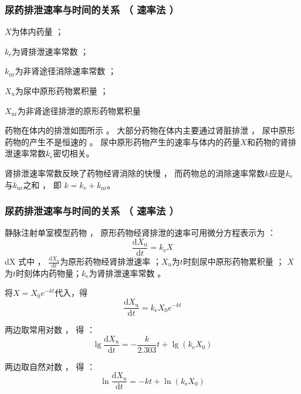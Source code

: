 \documentclass[dvipsnames, svgnames, x11names]{beamer}
\begin{document}
\begin{frame}
    \frametitle{尿药排泄速率与时间的关系 （ 速率法 ）}
    \begin{minipage}{0.48\linewidth}
        \begin{center}
        \end{center}
    \end{minipage}\hfill
    \begin{minipage}{0.48\linewidth}
        $X$为体内药量 ；

        $k_\mathrm{e}$为肾排泄速率常数 ；
        
        $k_{\mathrm{nr}}$为非肾途径消除速率常数 ；
        
        $X_\mathrm{u}$为尿中原形药物累积量 ；
        
        $X_{\mathrm{nr}}$为非肾途径排泄的原形药物累积量
    \end{minipage}

    \smallskip
    药物在体内的排泄如图所示 。 大部分药物在体内主要通过肾脏排泄 ， 尿中原形药物的产生不是恒速的 。 尿中原形药物产生的速率与体内的药量$X$和药物的肾排泄速率常数$k_\mathrm{e}$密切相关。

    肾排泄速率常数反映了药物经肾消除的快慢 ， 而药物总的消除速率常数$k$应是$k_\mathrm{e}$与$k_{\mathrm{nr}}$之和 ， 即 $k= k_\mathrm{e} + k_{\mathrm{nr}}$。
\end{frame}


\begin{frame}
    \frametitle{尿药排泄速率与时间的关系 （ 速率法 ）}
    静脉注射单室模型药物 ， 原形药物经肾排泄的速率可用微分方程表示为 ：
    \[
        \frac{\mathrm{d}X_{\mathrm{u}}}{\mathrm{d}t}=k_{\mathrm{e}}X
    \]
    dX
    式中 ， $\frac{\mathrm{d}X_{\mathrm{u}}}{\mathrm{d}t}$为原形药物经肾排泄速率 ；$X_{\mathrm{u}}$为$t$时刻尿中原形药物累积量 ； $X$为$t$时刻体内药物量；$k_{\mathrm{e}}$为肾排泄速率常数 。

    将$X = X_0e^{-kt}$代入，得
    \[
        \frac{\mathrm{d}X_{\mathrm{u}}}{\mathrm{d}t}=k_{\mathrm{e}}X_0e^{-kt}
    \]
    \begin{minipage}{0.48\linewidth}
        两边取常用对数 ， 得 ：
    \[
        \lg\frac{\mathrm{d}X_{\mathrm{u}}}{\mathrm{d}t}=-\frac{k}{2.303}t+\lg(k_\mathrm{e}X_0)
    \]
    \end{minipage}\hfill
    \begin{minipage}{0.48\linewidth}
        两边取自然对数 ， 得 ：
    \[
        \ln\frac{\mathrm{d}X_{\mathrm{u}}}{\mathrm{d}t}=-kt+\ln(k_\mathrm{e}X_0)
    \]
    \end{minipage}
    
\end{frame}
\end{document}
